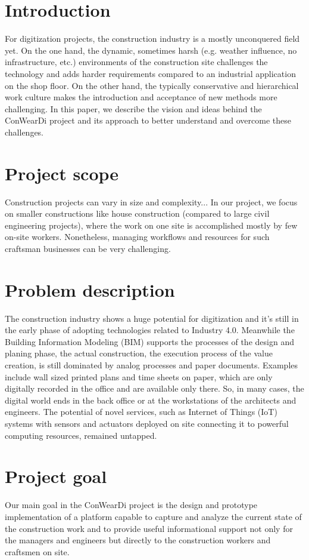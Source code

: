 \section{Introduction}
For digitization projects, the construction industry is a mostly unconquered field yet.
On the one hand, the dynamic, sometimes harsh (e.g. weather influence, no infrastructure, etc.) environments of the construction site challenges the technology and adds harder requirements compared to an industrial application on the shop floor. 
On the other hand, the typically conservative and hierarchical work culture makes the introduction and acceptance of new methods more challenging. 
In this paper, we describe the vision and ideas behind the ConWearDi project and its approach to better understand and overcome these challenges.

\section{Project scope}
Construction projects can vary in size and complexity...
In our project, we focus on smaller constructions like house construction (compared to large civil engineering projects), where the work on one site is accomplished mostly by few on-site workers. Nonetheless, managing workflows and resources for such craftsman businesses can be very challenging.

\section{Problem description}
The construction industry shows a huge potential for digitization and it's still in the early phase of adopting technologies related to Industry 4.0. 
Meanwhile the Building Information Modeling (BIM) supports the processes of the design and planing phase, the actual construction, the execution process of the value creation, is still dominated by analog processes and paper documents. 
Examples include wall sized printed plans and time sheets on paper, which are only digitally recorded in the office and are available only there. 
So, in many cases, the digital world ends in the back office or at the workstations of the architects and engineers. 
The potential of novel services, such as Internet of Things (IoT) systems with sensors and actuators deployed on site connecting it to powerful computing resources, remained untapped.

\section{Project goal}
Our main goal in the ConWearDi project is the design and prototype implementation of a platform capable to capture and analyze the current state of the construction work and to provide useful informational support not only for the managers and engineers but directly to the construction workers and craftsmen on site. 

